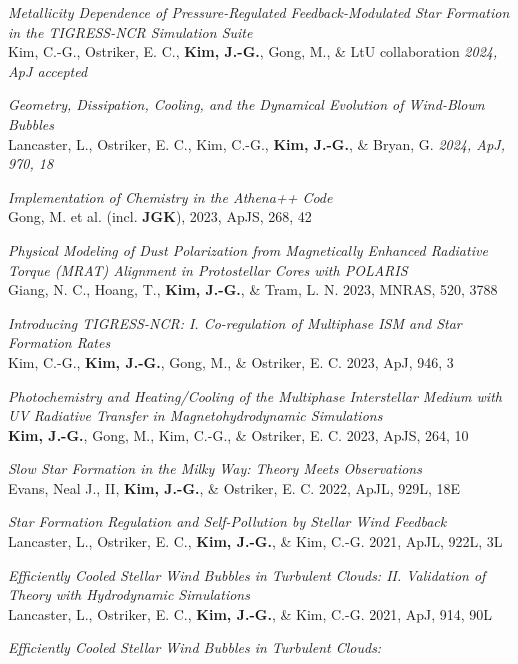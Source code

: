 \begin{benumerate}{22}
\item \textit{Metallicity Dependence of Pressure-Regulated Feedback-Modulated Star Formation in the TIGRESS-NCR Simulation Suite} \\ Kim, C.-G., Ostriker, E. C., \textbf{Kim, J.-G.}, Gong, M., \& LtU collaboration \textit{2024, ApJ accepted}
\item \textit{Geometry, Dissipation, Cooling, and the Dynamical Evolution of Wind-Blown Bubbles} \\ Lancaster, L., Ostriker, E. C., Kim, C.-G., \textbf{Kim, J.-G.}, \& Bryan, G. \textit{2024, ApJ, 970, 18}
\item \textit{Implementation of Chemistry in the Athena++ Code} \\ Gong, M. et al. (incl.
\textbf{JGK}), 2023, ApJS, 268, 42
\item \textit{Physical Modeling of Dust Polarization from Magnetically Enhanced Radiative
    Torque (MRAT) Alignment in Protostellar Cores with POLARIS} \\ Giang, N. C., Hoang,
  T., \textbf{Kim, J.-G.}, \& Tram, L. N. 2023, MNRAS, 520, 3788
\item \textit{Introducing TIGRESS-NCR: I. Co-regulation of Multiphase ISM and
Star Formation Rates} \\ Kim, C.-G., \textbf{Kim, J.-G.}, Gong, M., \& Ostriker,
E. C. 2023, ApJ, 946, 3
\item \textit{Photochemistry and Heating/Cooling of the Multiphase Interstellar
Medium with UV Radiative Transfer in Magnetohydrodynamic Simulations} \\
\textbf{Kim, J.-G.}, Gong, M., Kim, C.-G., \& Ostriker, E. C. 2023, ApJS, 264, 10
\item \textit{Slow Star Formation in the Milky Way: Theory Meets Observations}\\
  Evans, Neal J., II, \textbf{Kim, J.-G.}, \& Ostriker, E. C. 2022, ApJL, 929L,
  18E
\item \textit{Star Formation Regulation and Self-Pollution by Stellar Wind
    Feedback}\\
  Lancaster, L., Ostriker, E. C., \textbf{Kim, J.-G.}, \& Kim, C.-G. 2021, ApJL,
  922L, 3L
\item \textit{Efficiently Cooled Stellar Wind Bubbles in Turbulent Clouds:
    II. Validation of Theory with Hydrodynamic Simulations}\\
  Lancaster, L., Ostriker, E. C., \textbf{Kim, J.-G.}, \& Kim, C.-G. 2021, ApJ,
  914, 90L
\item \textit{Efficiently Cooled Stellar Wind Bubbles in Turbulent Clouds:
}
\end{benumerate}
